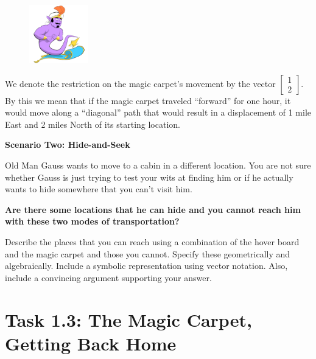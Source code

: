 \documentclass[14pt]{problemset}
\newcommand{\mat}[1]{\begin{bmatrix}#1\end{bmatrix}}
\begin{document}
\begin{minipage}{\textwidth}
	\vspace{.5cm}
	\begin{figure}
	\vspace{-.8cm}
	\includegraphics[width=1in]{images/MagicCarpet-small.png}
	\end{figure}

	We denote the restriction on the magic carpet's movement by the vector
	$\mat{1 \\2 }$. By this we mean that if the
	magic carpet traveled ``forward'' for one hour, it would move along a
	``diagonal'' path that would result in a displacement of 1 mile East and
	2 miles North of its starting location.
	\vspace{1cm}
\end{minipage}



\textbf{Scenario Two: Hide-and-Seek}

Old Man Gauss wants to move to a cabin in a different location. You are
not sure whether Gauss is just trying to test your wits at finding him
or if he actually wants to hide somewhere that you can't visit him.

\vspace{5mm}

\textbf{Are there some locations that he can hide and you cannot reach him
with these two modes of transportation?}

Describe the places that you
can reach using a combination of the hover board and the magic carpet and
those you cannot. Specify these geometrically and algebraically. Include
a symbolic representation using vector notation. Also, include a convincing
argument supporting your answer.





\newpage
\pagestyle{siefken}

\newpage
\pagestyle{iola}
\section*{Task 1.3: The Magic Carpet, Getting Back Home}
\end{document}
